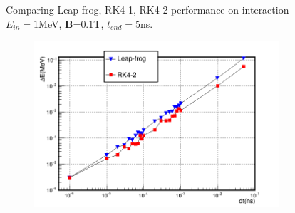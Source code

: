 \documentclass[a4paper,oneside,12pt]{report}
\numberwithin{equation}{chapter}
\begin{document}
{\begin{figure}[H]
    \vspace{0pt}
    \caption{\centering Comparing Leap-frog, RK4-1, RK4-2 performance on \eB interaction $E_{in}=1$MeV, \textbf{B}=$0.1$T, $t_{end}=5$ns.} 
    \label{fig:lf_rk1_rk2_comparison}
\end{figure}

\iffalse \begin{figure}[H]
    \centering
    \begin{subfigure}{0.9\textwidth}
        \centering
        \includegraphics[width=\linewidth]{./figures/analiz/staticE_lf_rk2_dt-E.png}
    \end{subfigure}
    

\end{figure}}
\end{document}
